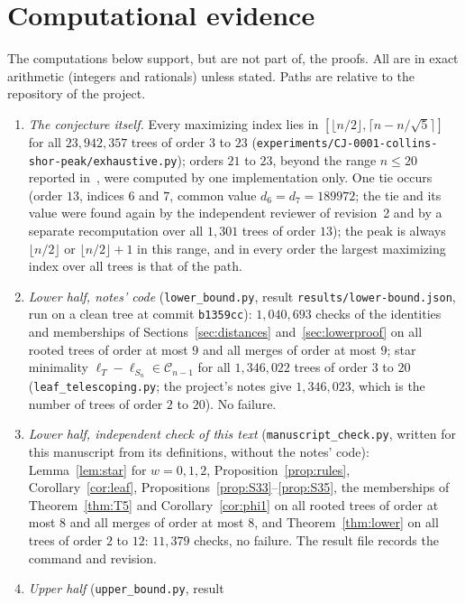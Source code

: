 \documentclass[11pt]{amsart}
\theoremstyle{definition}
\theoremstyle{remark}
\begin{document}
\section{Computational evidence}\label{sec:comp}

The computations below support, but are not part of, the proofs. All are
in exact arithmetic (integers and rationals) unless stated. Paths are
relative to the repository of the project.

\begin{enumerate}
\item \emph{The conjecture itself.} Every maximizing index lies in
$[\lfloor n/2\rfloor,\lceil n-n/\sqrt5\rceil]$ for all $23{,}942{,}357$ trees of
order $3$ to $23$ (\nolinkurl{experiments/CJ-0001-collins-shor-peak/exhaustive.py});
orders $21$ to $23$, beyond the range $n\le20$ reported in~\cite{AAB}, were
computed by one implementation only. One tie occurs (order $13$, indices $6$
and $7$, common value $d_6=d_7=189972$; the tie and its value were found
again by the independent reviewer of revision~2 and by a separate
recomputation over all $1{,}301$ trees of order $13$); the peak is always
$\lfloor n/2\rfloor$ or $\lfloor n/2\rfloor+1$ in this range, and in every
order the largest maximizing index over all trees is that of the path.
\item \emph{Lower half, notes' code} (\nolinkurl{lower_bound.py}, result
\nolinkurl{results/lower-bound.json}, run on a clean tree at commit
\texttt{b1359cc}): $1{,}040{,}693$ checks of the identities and memberships of
Sections~\ref{sec:distances} and~\ref{sec:lowerproof} on all rooted trees of
order at most $9$ and all merges of order at most $9$; star minimality
$\ell_T-\ell_{S_n}\in\mathcal C_{n-1}$ for all $1{,}346{,}022$ trees of order
$3$ to $20$ (\nolinkurl{leaf_telescoping.py}; the project's notes give
$1{,}346{,}023$, which is the number of trees of order $2$ to $20$). No
failure.
\item \emph{Lower half, independent check of this text}
(\nolinkurl{manuscript_check.py}, written for this manuscript from its
definitions, without the notes' code): Lemma~\ref{lem:star} for $w=0,1,2$,
Proposition~\ref{prop:rules}, Corollary~\ref{cor:leaf},
Propositions~\ref{prop:S33}--\ref{prop:S35}, the memberships of
Theorem~\ref{thm:T5} and Corollary~\ref{cor:phi1} on all rooted trees of
order at most $8$ and all merges of order at most $8$, and
Theorem~\ref{thm:lower} on all trees of order $2$ to $12$: $11{,}379$ checks,
no failure. The result file records the command and revision.
\item \emph{Upper half} (\nolinkurl{upper_bound.py}, result

\end{enumerate}
\end{document}
